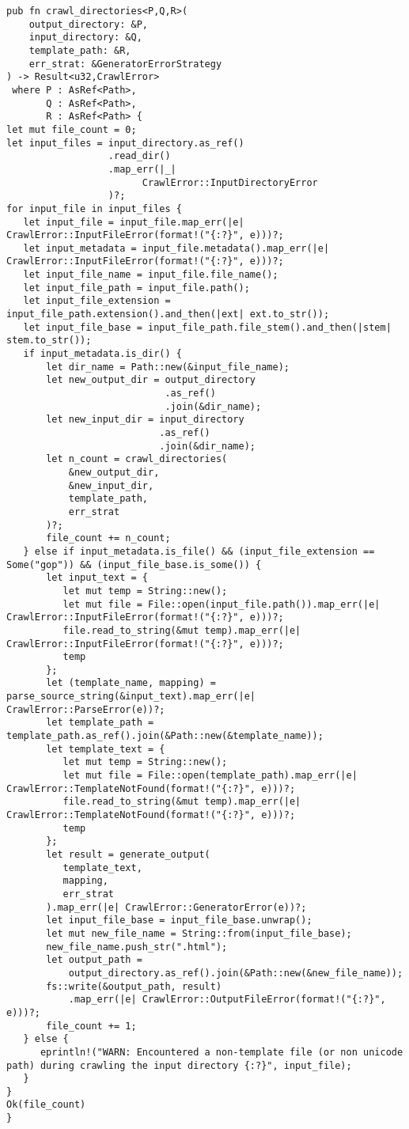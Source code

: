 \documentclass[11pt]{article}
\begin{document}
\begin{verbatim}
pub fn crawl_directories<P,Q,R>(
    output_directory: &P, 
    input_directory: &Q, 
    template_path: &R, 
    err_strat: &GeneratorErrorStrategy
) -> Result<u32,CrawlError> 
 where P : AsRef<Path>,
       Q : AsRef<Path>,
       R : AsRef<Path> {
let mut file_count = 0;
let input_files = input_directory.as_ref()
                  .read_dir()
                  .map_err(|_| 
                        CrawlError::InputDirectoryError
                  )?;
for input_file in input_files {
   let input_file = input_file.map_err(|e| CrawlError::InputFileError(format!("{:?}", e)))?;
   let input_metadata = input_file.metadata().map_err(|e| CrawlError::InputFileError(format!("{:?}", e)))?;
   let input_file_name = input_file.file_name();
   let input_file_path = input_file.path();
   let input_file_extension = input_file_path.extension().and_then(|ext| ext.to_str());
   let input_file_base = input_file_path.file_stem().and_then(|stem| stem.to_str());
   if input_metadata.is_dir() {
       let dir_name = Path::new(&input_file_name);
       let new_output_dir = output_directory
                            .as_ref()
                            .join(&dir_name);
       let new_input_dir = input_directory
                           .as_ref()
                           .join(&dir_name);
       let n_count = crawl_directories(
           &new_output_dir, 
           &new_input_dir, 
           template_path, 
           err_strat
       )?;
       file_count += n_count;
   } else if input_metadata.is_file() && (input_file_extension == Some("gop")) && (input_file_base.is_some()) {
       let input_text = {
          let mut temp = String::new();
          let mut file = File::open(input_file.path()).map_err(|e| CrawlError::InputFileError(format!("{:?}", e)))?;
          file.read_to_string(&mut temp).map_err(|e| CrawlError::InputFileError(format!("{:?}", e)))?;
          temp
       };
       let (template_name, mapping) = parse_source_string(&input_text).map_err(|e| CrawlError::ParseError(e))?;
       let template_path = template_path.as_ref().join(&Path::new(&template_name));
       let template_text = {
          let mut temp = String::new();
          let mut file = File::open(template_path).map_err(|e| CrawlError::TemplateNotFound(format!("{:?}", e)))?;
          file.read_to_string(&mut temp).map_err(|e| CrawlError::TemplateNotFound(format!("{:?}", e)))?;
          temp
       };
       let result = generate_output(
          template_text, 
          mapping, 
          err_strat
       ).map_err(|e| CrawlError::GeneratorError(e))?;
       let input_file_base = input_file_base.unwrap();
       let mut new_file_name = String::from(input_file_base);
       new_file_name.push_str(".html");
       let output_path = 
           output_directory.as_ref().join(&Path::new(&new_file_name));
       fs::write(&output_path, result)
           .map_err(|e| CrawlError::OutputFileError(format!("{:?}", e)))?;
       file_count += 1;
   } else {
      eprintln!("WARN: Encountered a non-template file (or non unicode path) during crawling the input directory {:?}", input_file);
   }
}
Ok(file_count)
}
\end{verbatim}
\end{document}
